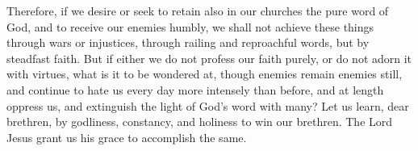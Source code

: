 Therefore, if we desire or seek to retain also in our churches the pure word of God, and to receive our enemies humbly, we shall not achieve these things through wars or injustices, through railing and reproachful words, but by steadfast faith. But if either we do not profess our faith purely, or do not adorn it with virtues, what is it to be wondered at, though enemies remain enemies still, and continue to hate us every day more intensely than before, and at length oppress us, and extinguish the light of God’s word with many? Let us learn, dear brethren, by godliness, constancy, and holiness to win our brethren. The Lord Jesus grant us his grace to accomplish the same.
